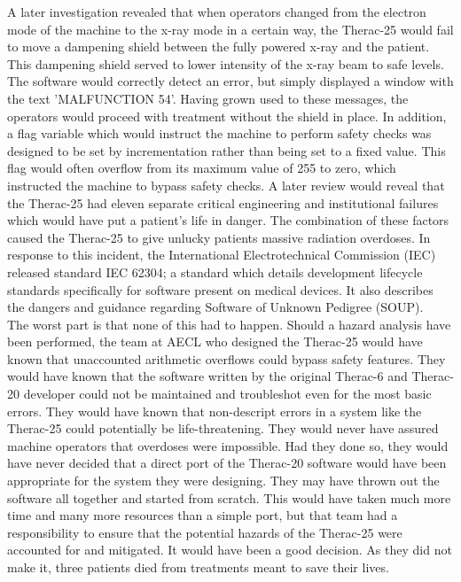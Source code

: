\documentclass{article}
\begin{document}
A later investigation revealed that when operators changed from the electron mode of the machine to the x-ray mode in a certain way, the Therac-25 would fail to move a dampening shield between the fully powered x-ray and the patient. This dampening shield served to lower intensity of the x-ray beam to safe levels. The software would correctly detect an error, but simply displayed a window with the text 'MALFUNCTION 54'. Having grown used to these messages, the operators would proceed with treatment without the shield in place. In addition, a flag variable which would instruct the machine to perform safety checks was designed to be set by incrementation rather than being set to a fixed value. This flag would often overflow from its maximum value of 255 to zero, which instructed the machine to bypass safety checks. A later review would reveal that the Therac-25 had eleven separate critical engineering and institutional failures which would have put a patient's life in danger. The combination of these factors caused the Therac-25 to give unlucky patients massive radiation overdoses. In response to this incident, the International Electrotechnical Commission (IEC) released standard IEC 62304; a standard which details development lifecycle standards specifically for software present on medical devices. It also describes the dangers and guidance regarding Software of Unknown Pedigree (SOUP).\\

The worst part is that none of this had to happen. Should a hazard analysis have been performed, the team at AECL who designed the Therac-25 would have known that unaccounted arithmetic overflows could bypass safety features. They would have known that the software written by the original Therac-6 and Therac-20 developer could not be maintained and troubleshot even for the most basic errors. They would have known that non-descript errors in a system like the Therac-25 could potentially be life-threatening. They would never have assured machine operators that overdoses were impossible. Had they done so, they would have never decided that a direct port of the Therac-20 software would have been appropriate for the system they were designing. They may have thrown out the software all together and started from scratch. This would have taken much more time and many more resources than a simple port, but that team had a responsibility to ensure that the potential hazards of the Therac-25 were accounted for and mitigated. It would have been a good decision. As they did not make it, three patients died from treatments meant to save their lives.\cite{rose_1994}\\
\end{document}
